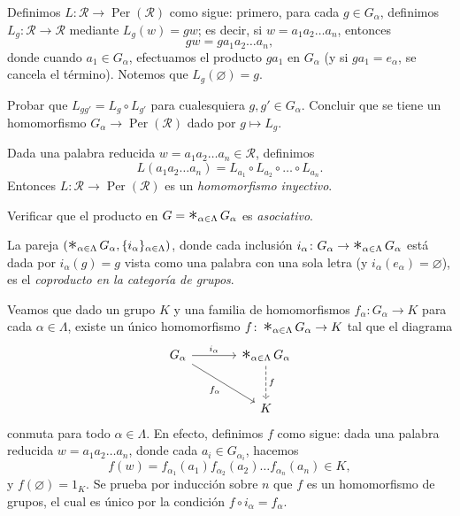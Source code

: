 \begin{definicion}
Definimos $L \colon \mathcal{R} \to \operatorname{Per}(\mathcal{R})$ como sigue: primero, para cada $g \in G_\alpha$, definimos $L_g \colon \mathcal{R} \to \mathcal{R}$ mediante $L_g(w) = gw$; es decir, si $w = a_1 a_2 \dots a_n$, entonces
\[
gw = g a_1 a_2 \dots a_n,
\]
donde cuando $a_1 \in G_\alpha$, efectuamos el producto $g a_1$ en $G_\alpha$ (y si $g a_1 = e_\alpha$, se cancela el término). Notemos que $L_g(\varnothing) = g$.
\end{definicion}

\begin{ejercicio}
Probar que $L_{g g'} = L_g \circ L_{g'}$ para cualesquiera $g, g' \in G_\alpha$. Concluir que se tiene un homomorfismo $G_\alpha \to \operatorname{Per}(\mathcal{R})$ dado por $g \mapsto L_g$.
\end{ejercicio}

Dada una palabra reducida $w = a_1 a_2 \dots a_n \in \mathcal{R}$, definimos
\[
L(a_1 a_2 \dots a_n) = L_{a_1} \circ L_{a_2} \circ \dots \circ L_{a_n}.
\]
Entonces $L \colon \mathcal{R} \to \operatorname{Per}(\mathcal{R})$ es un \textit{homomorfismo inyectivo}.

\begin{ejercicio}
Verificar que el producto en $G = \mathop{\scalebox{1.5}{$\ast$}}_{\alpha \in \Lambda} G_\alpha$ es \textit{asociativo}.
\end{ejercicio}

\begin{prop}
La pareja $\left( \mathop{\scalebox{1.5}{$\ast$}}_{\alpha \in \Lambda} G_\alpha, \{i_\alpha\}_{\alpha \in \Lambda} \right)$, donde cada inclusión $i_\alpha \colon G_\alpha \to \mathop{\scalebox{1.5}{$\ast$}}_{\alpha \in \Lambda} G_\alpha$ está dada por $i_\alpha(g) = g$ vista como una palabra con una sola letra (y $i_\alpha(e_\alpha) = \varnothing$), es el \textit{coproducto en la categoría de grupos}.
\end{prop}

\begin{dem}
Veamos que dado un grupo $K$ y una familia de homomorfismos $f_\alpha \colon G_\alpha \to K$ para cada $\alpha \in \Lambda$, existe un único homomorfismo $f \colon \mathop{\scalebox{1.5}{$\ast$}}_{\alpha \in \Lambda} G_\alpha \to K$ tal que el diagrama
\[
\begin{tikzcd}[row sep=large, column sep=large]
G_\alpha \arrow[r, "i_\alpha"] \arrow[dr, "f_\alpha"'] & \mathop{\scalebox{1.5}{$\ast$}}_{\alpha \in \Lambda} G_\alpha \arrow[d, "f", dashed] \\
& K
\end{tikzcd}
\]
conmuta para todo $\alpha \in \Lambda$. En efecto, definimos $f$ como sigue: dada una palabra reducida $w = a_1 a_2 \dots a_n$, donde cada $a_i \in G_{\alpha_i}$, hacemos
\[
f(w) = f_{\alpha_1}(a_1) f_{\alpha_2}(a_2) \dots f_{\alpha_n}(a_n) \in K,
\]
y $f(\varnothing) = 1_K$. Se prueba por inducción sobre $n$ que $f$ es un homomorfismo de grupos, el cual es único por la condición $f \circ i_\alpha = f_\alpha$.
\end{dem}


